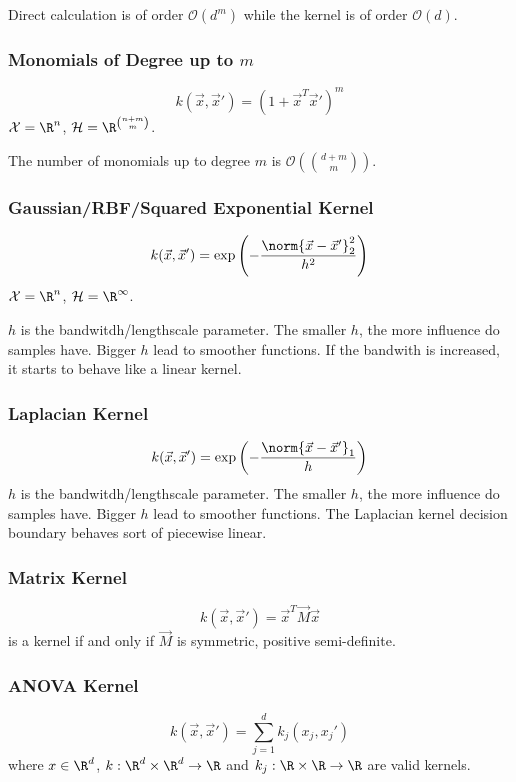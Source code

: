 Direct calculation is of order $\mathcal{O}(d^m)$
while the kernel is of order $\mathcal{O}(d)$.

\subsubsection{Monomials of Degree up to $m$}
\begin{equation*}
k(\vec{x}, \vec{x}') = (1 + \vec{x}^T \vec{x}')^m
\end{equation*}
$\mathcal{X} = \R^n$,
$\mathcal{H} = \R^{\binom{n+m}{m}}$.

The number of monomials up to degree $m$ is
$\mathcal{O}(\binom{d+m}{m})$.

\subsubsection{Gaussian/RBF/Squared Exponential Kernel}
\begin{equation*}
k(\vec{x}, \vec{x}') = \exp\left(
-\frac{\norm{\vec{x} - \vec{x}'}_2^2}{h^2}
\right)
\end{equation*}
$\mathcal{X} = \R^n$,
$\mathcal{H} = \R^\infty$.

$h$ is the bandwitdh/lengthscale parameter.
The smaller $h$, the more influence do samples have.
Bigger $h$ lead to smoother functions.
If the bandwith is increased,
it starts to behave like a linear kernel.

\subsubsection{Laplacian Kernel}
\begin{equation*}
k(\vec{x}, \vec{x}') = \exp\left(
-\frac{\norm{\vec{x} - \vec{x}'}_1}{h}
\right)
\end{equation*}
$h$ is the bandwitdh/lengthscale parameter.
The smaller $h$, the more influence do samples have.
Bigger $h$ lead to smoother functions.
The Laplacian kernel decision boundary behaves
sort of piecewise linear.


\subsubsection{Matrix Kernel}
\begin{equation*}
k(\vec{x}, \vec{x}') = \vec{x}^T \vec{M} \vec{x}
\end{equation*}
is a kernel if and only if $\vec{M}$ is
symmetric, positive semi-definite.

\subsubsection{ANOVA Kernel}
\begin{equation*}
k(\vec{x}, \vec{x}') = 
\sum_{j=1}^d{
	k_j(x_j, x_j')
}
\end{equation*}
where $x \in \R^d$,
$k : \R^d \times \R^d \to \R$ and
$k_j : \R \times \R \to \R$
are valid kernels.

